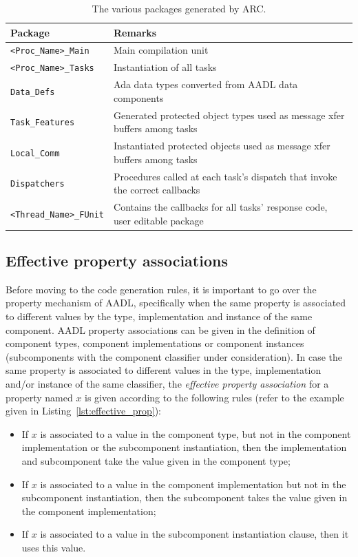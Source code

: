 \begin{table}
\begin{tabular}{|l|l|}
\hline
\textbf{Package} & \textbf{Remarks}\\
\hline
\texttt{<Proc\_Name>\_Main} & Main compilation unit\\
\texttt{<Proc\_Name>\_Tasks} & Instantiation of all tasks\\
\texttt{Data\_Defs} & Ada data types converted from AADL
data components\\
\texttt{Task\_Features} & Generated protected object
types used as message xfer buffers among tasks\\
\texttt{Local\_Comm} & Instantiated protected
objects used as message xfer buffers among tasks\\
\texttt{Dispatchers} & Procedures called at each
task's dispatch that invoke the correct callbacks\\
\texttt{<Thread\_Name>\_FUnit} & Contains the callbacks for all tasks'
response code, user editable package\\
\hline
\end{tabular}
\caption{The various packages generated by ARC.}
\label{tab:packages}
\end{table}

\subsection{Effective property associations}
Before moving to the code generation rules, it is important to go over
the property mechanism of AADL, specifically when the same property is
associated to different values by the type, implementation and
instance of the same component. AADL property associations can be
given in the definition of component types, component implementations
or component instances (subcomponents with the component classifier
under consideration). In case the same property is associated to
different values in the type, implementation and/or instance of the
same classifier, the \emph{effective property association} for a
property named $x$ is given according to the following rules (refer to
the example given in Listing~\ref{lst:effective_prop}):

\begin{itemize}
\item{If $x$ is associated to a value in the component type, but not
  in the component implementation or the subcomponent instantiation,
  then the implementation and subcomponent take the value given in the
  component type;}
\item{If $x$ is associated to a value in the component implementation
  but not in the subcomponent instantiation, then the subcomponent
  takes the value given in the component implementation;}
\item{If $x$ is associated to a value in the subcomponent
  instantiation clause, then it uses this value.}
\end{itemize}


